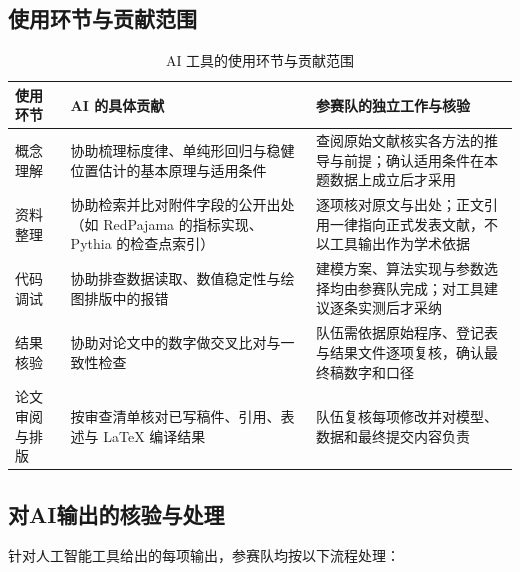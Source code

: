 \documentclass[bwprint]{gmcmthesis}
\numberwithin{equation}{section}
\numberwithin{figure}{section}
\numberwithin{table}{section}
\begin{document}
\begin{appendices}


\subsection{使用环节与贡献范围}

\begin{table}[htp!]
\centering
\renewcommand\arraystretch{1.3}
\begin{tabularx}{\textwidth}{lXX}
  \toprule
  使用环节 & AI 的具体贡献 & 参赛队的独立工作与核验 \\
  \midrule
  概念理解 &
  协助梳理标度律、单纯形回归与稳健位置估计的基本原理与适用条件 &
  查阅原始文献核实各方法的推导与前提；确认适用条件在本题数据上成立后才采用 \\
  资料整理 &
  协助检索并比对附件字段的公开出处（如 RedPajama 的指标实现、Pythia 的检查点索引） &
  逐项核对原文与出处；正文引用一律指向正式发表文献，不以工具输出作为学术依据 \\
  代码调试 &
  协助排查数据读取、数值稳定性与绘图排版中的报错 &
  建模方案、算法实现与参数选择均由参赛队完成；对工具建议逐条实测后才采纳 \\
  结果核验 &
  协助对论文中的数字做交叉比对与一致性检查 &
  队伍需依据原始程序、登记表与结果文件逐项复核，确认最终稿数字和口径 \\
  论文审阅与排版 &
  按审查清单核对已写稿件、引用、表述与 LaTeX 编译结果 &
  队伍复核每项修改并对模型、数据和最终提交内容负责 \\
  \bottomrule
\end{tabularx}
\caption{AI 工具的使用环节与贡献范围}
\label{tab:ai-usage}
\end{table}


\subsection{对AI输出的核验与处理}

针对人工智能工具给出的每项输出，参赛队均按以下流程处理：


\end{appendices}
\end{document}
